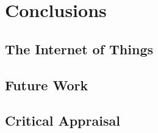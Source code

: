\chapter{Conclusions}
  \section{The Internet of Things}


  \section{Future Work}

  \section{Critical Appraisal}


